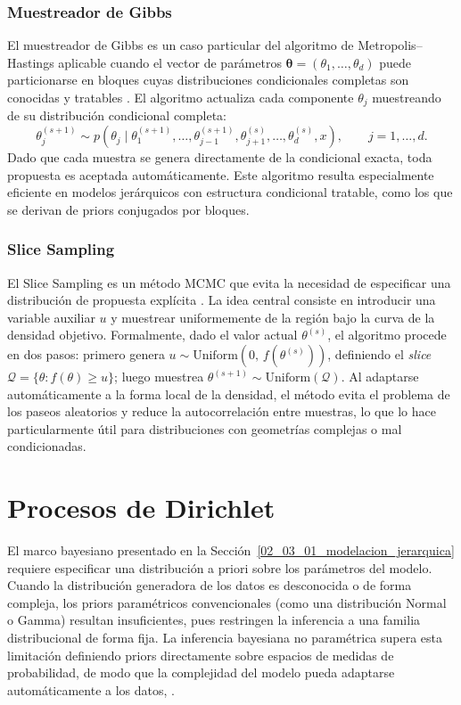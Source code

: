 \subsubsection{Muestreador de Gibbs}
\label{02_03_02_02_muestreador_gibbs}
El muestreador de Gibbs es un caso particular del algoritmo de Metropolis--Hastings aplicable cuando el vector de parámetros $\boldsymbol{\theta} = (\theta_1, \dots, \theta_d)$ puede particionarse en bloques cuyas distribuciones condicionales completas son conocidas y tratables \cite{02_07_rizzo2007statistical}. El algoritmo actualiza cada componente $\theta_j$ muestreando de su distribución condicional completa:
\begin{equation}
    \theta_j^{(s+1)} \sim p\!\left(\theta_j \mid
    \theta_1^{(s+1)}, \dots, \theta_{j-1}^{(s+1)},
    \theta_{j+1}^{(s)}, \dots, \theta_d^{(s)}, x\right),
    \qquad j = 1, \dots, d.
\end{equation}
Dado que cada muestra se genera directamente de la condicional exacta, toda propuesta es aceptada automáticamente. Este algoritmo resulta especialmente eficiente en modelos jerárquicos con estructura condicional tratable, como los que se derivan de priors conjugados por bloques.

\subsubsection{Slice Sampling}
\label{02_03_02_03_slice_sampling}
El Slice Sampling es un método MCMC que evita la necesidad de especificar una distribución de propuesta explícita \cite{02_07_neal2003slice}. La idea central consiste en introducir una variable auxiliar $u$ y muestrear uniformemente de la región bajo la curva de la densidad objetivo. Formalmente, dado el valor actual $\theta^{(s)}$, el algoritmo procede en dos pasos: primero genera $u \sim \mathrm{Uniform}(0,\, f(\theta^{(s)}))$, definiendo el \textit{slice} $\mathcal{Q} = \{\theta : f(\theta) \geq u\}$; luego muestrea $\theta^{(s+1)} \sim \mathrm{Uniform}(\mathcal{Q})$. Al adaptarse automáticamente a la forma local de la densidad, el método evita el problema de los paseos aleatorios y reduce la autocorrelación entre muestras, lo que lo hace particularmente útil para distribuciones con geometrías complejas o mal condicionadas.

\section{Procesos de Dirichlet}
\label{02_04_00_procesos_dirichlet}
El marco bayesiano presentado en la Sección~\ref{02_03_01_modelacion_jerarquica} requiere especificar una distribución a priori sobre los parámetros del modelo. Cuando la distribución generadora de los datos es desconocida o de forma compleja, los priors paramétricos convencionales (como una distribución Normal o Gamma) resultan insuficientes, pues restringen la inferencia a una familia distribucional de forma fija. La inferencia bayesiana no paramétrica supera esta limitación definiendo priors directamente sobre espacios de medidas de probabilidad, de modo que la complejidad del modelo pueda adaptarse automáticamente a los datos, \cite{02_04_muller2015bayesian}.\\

